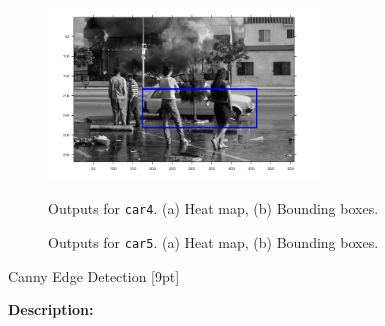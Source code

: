 \documentclass{assignment}
\begin{document}
\begin{problemlist}
\begin{figure}[H]
\begin{center}
{            \label{fig:4_3car4_subfig:b}
            \includegraphics[height = 1.8in]{4_3car4_predicted}}
        \caption{Outputs for \texttt{car4}. (a) Heat map, (b) Bounding boxes.}
        \label{fig:4_3car4_images}
    \end{center}
\end{figure}
\begin{figure}[H]
    \begin{center}
        \hspace{0.5cm}
        \caption{Outputs for \texttt{car5}. (a) Heat map, (b) Bounding boxes.}
        \label{fig:4_3car5_images}
    \end{center}
\end{figure}

\newpage
\pbitem Canny Edge Detection [9pt]

\textbf{Description:}


\end{problemlist}
\end{document}
